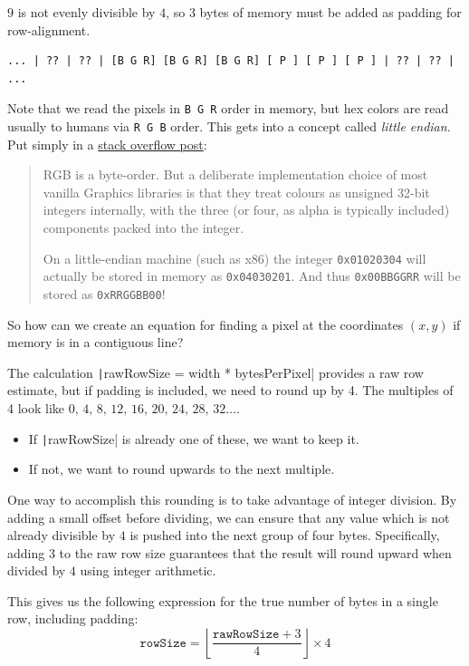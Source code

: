 $9$ is not evenly divisible by $4$, so 3 bytes of memory must be added as padding for row-alignment.
\begin{verbatim}
... | ?? | ?? | [B G R] [B G R] [B G R] [ P ] [ P ] [ P ] | ?? | ?? | ...
\end{verbatim}

Note that we read the pixels in \texttt{B G R} order in memory, but hex colors are read usually to humans via \texttt{R G B} order. This gets into a concept called \emph{little endian}. Put simply in a \href{https://stackoverflow.com/questions/367449/what-exactly-is-bgr-color-space}{stack overflow post}:
\begin{quote}
    RGB is a byte-order. But a deliberate implementation choice of most vanilla Graphics libraries is that they treat colours as unsigned 32-bit integers internally, with the three (or four, as alpha is typically included) components packed into the integer.

    On a little-endian machine (such as x86) the integer \texttt{0x01020304} will actually be stored in memory as \texttt{0x04030201}. And thus \texttt{0x00BBGGRR} will be stored as \texttt{0xRRGGBB00}!
\end{quote}

So how can we create an equation for finding a pixel at the coordinates $(x,y)$ if memory is in a contiguous line?

The calculation \texttt|rawRowSize = width * bytesPerPixel| provides a raw row estimate, but if padding is included, we need to round up by 4. 
The multiples of 4 look like $0,\, 4,\, 8,\, 12,\, 16,\, 20,\, 24,\, 28,\, 32 \dots$. 
\begin{itemize}
    \item If \texttt|rawRowSize| is already one of these, we want to keep it.
    \item If not, we want to round upwards to the next multiple.
\end{itemize}

One way to accomplish this rounding is to take advantage of integer division. By adding a small offset before dividing, we can ensure that any value which is not already divisible by $4$ is pushed into the next group of four bytes. Specifically, adding $3$ to the raw row size guarantees that the result will round upward when divided by $4$ using integer arithmetic.

This gives us the following expression for the true number of bytes in a single row, including padding:
$$\texttt{rowSize} = \left\lfloor \frac{\texttt{rawRowSize} + 3}{4} \right\rfloor \times 4$$

